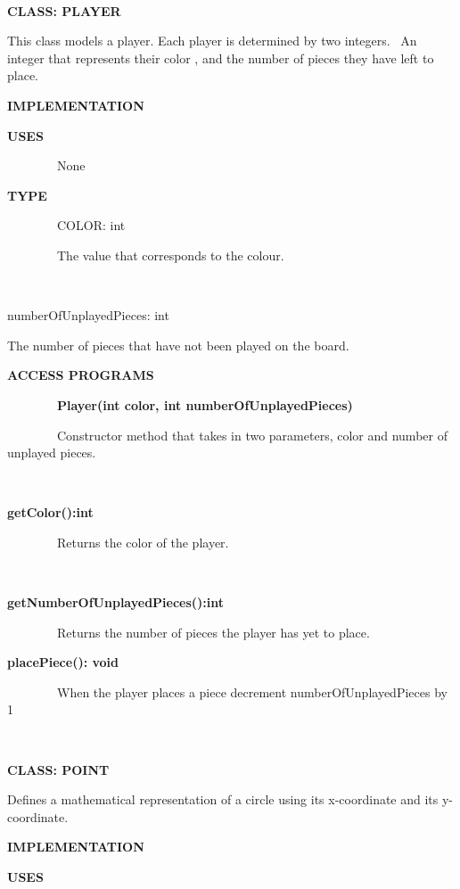 \documentclass{article}
\begin{document}
{{~~~~~~~~~~~~~~~~}

{}

{\textbf{CLASS: PLAYER}}

{This class models a player. Each player is determined by two integers.
~An integer that represents their color , and the number of pieces they
have left to place.}

{}

{\textbf{IMPLEMENTATION}}

{\textbf{USES}}

{~~~~~~~~None}

{\textbf{TYPE}}

{~~~~~~~~COLOR: int}

{~~~~~~~~The value that corresponds to the colour.}

{~~~~~~~~}

{numberOfUnplayedPieces: int}

{The number of pieces that have not been played on the board.}

{}

{\textbf{ACCESS PROGRAMS~~~~~~~~}}

{~~~~~~~~\textbf{Player(int color, int numberOfUnplayedPieces)}}

{~~~~~~~~Constructor method that takes in two parameters, color and
number of unplayed pieces.}

{}

{~~~~~~~~}

{\textbf{getColor():int}}

{~~~~~~~~Returns the color of the player.}

{~~~~~~~~~~~~~~~~}

{\textbf{getNumberOfUnplayedPieces():int}}

{~~~~~~~~Returns the number of pieces the player has yet to place.}

{}

{\textbf{placePiece(): void}}

{~~~~~~~~When the player places a piece }{decrement
numberOfUnplayedPieces by 1}

{~~~~~~~~}

{}

{\textbf{CLASS: POINT}}

{Defines a mathematical representation of a circle using its
x-coordinate and its y-coordinate.}

{}

{\textbf{IMPLEMENTATION}}

{\textbf{USES}}

}
\end{document}
